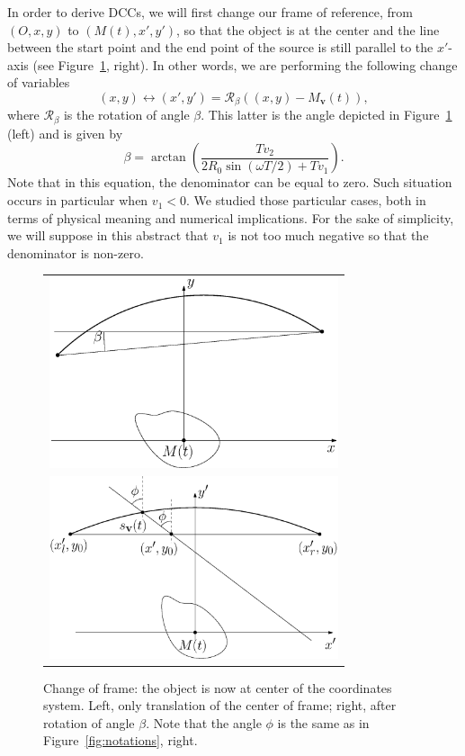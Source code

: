 \documentclass[twocolumn]{IEEEtran}
\numberwithin{equation}{section}
\newcommand{\Mbv}{M_{\mathbf{v}}}
\begin{document}
In order to derive DCCs, we will first change our frame of reference, from $\left(O, x, y\right)$ to $\left(M(t), x', y'\right)$, so that the object is at the center and the line between the start point and the end point of the source is still parallel to the $x'$-axis (see Figure~\ref{fig:change_frame}, right). In other words, we are performing the following change of variables
\begin{equation}
	(x,y) \leftrightarrow (x',y') = \mathcal{R}_{\beta} \left( (x,y)-\Mbv(t) \right),
\end{equation}
where $\mathcal{R}_{\beta}$ is the rotation of angle $\beta$. This latter is the angle depicted in Figure~\ref{fig:change_frame} (left) and is given by
\begin{equation}
	\beta = \arctan \left( \frac{T v_2}{2R_0 \sin(\omega T/2) + T v_1} \right).
\end{equation}
Note that in this equation, the denominator can be equal to zero. Such situation occurs in particular when $v_1 < 0$. We studied those particular cases, both in terms of physical meaning and numerical implications. For the sake of simplicity, we will suppose in this abstract that $v_1$ is not too much negative so that the denominator is non-zero.

\begin{figure}[!ht]
	\centering
	\begin{tabular}{c}
	\includegraphics[width=85mm]{figs/frame_object_before_rotation.eps} \\
	\includegraphics[width=85mm]{figs/frame_object.eps}
	\end{tabular}
	\caption{Change of frame: the object is now at center of the coordinates system. Left, only translation of the center of frame; right, after rotation of angle $\beta$. Note that the angle $\phi$ is the same as in Figure~\ref{fig:notations}, right.\label{fig:change_frame}}
\end{figure}
\end{document}
